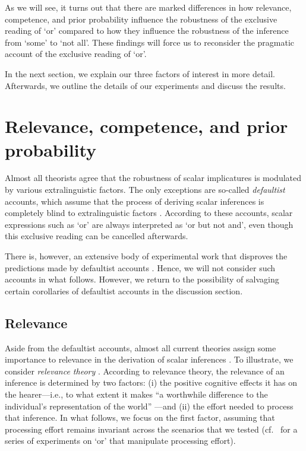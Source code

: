 \documentclass[12pt]{article}
\begin{document}
As we will see, it turns out that there are marked differences in how relevance, competence, and prior probability influence the robustness of the exclusive reading of `or' compared to how they influence the robustness of the inference from `some' to `not all'. These findings will force us to reconsider the pragmatic account of the exclusive reading of `or'.

In the next section, we explain our three factors of interest in more detail. Afterwards, we outline the details of our experiments and discuss the results.

\section{Relevance, competence, and prior probability}

Almost all theorists agree that the robustness of scalar implicatures is modulated by various extralinguistic factors. The only exceptions are so-called \emph{defaultist} accounts, which assume that the process of deriving scalar inferences is completely blind to extralinguistic factors \citep[e.g.,][]{chierchia2004, levinson2000, storto2005}. According to these accounts, scalar expressions such as `or' are always interpreted as `or but not and', even though this exclusive reading can be cancelled afterwards.

There is, however, an extensive body of experimental work that disproves the predictions made by defaultist accounts \citep[e.g.,][]{bott2004, breheny2006, huang2011}. Hence, we will not consider such accounts in what follows. However, we return to the possibility of salvaging certain corollaries of defaultist accounts in the discussion section.

\subsection*{Relevance}



Aside from the defaultist accounts, almost all current theories assign some importance to relevance in the derivation of scalar inferences \citep[e.g.,][]{geurts2010, magri2011}. To illustrate, we consider \emph{relevance theory} \citep{sperber1995}. According to relevance theory, the relevance of an inference is determined by two factors: (i) the positive cognitive effects it has on the hearer---i.e., to what extent it makes ``a worthwhile difference to the individual's representation of the world'' \citep[p.\ 251]{wilson2002}---and (ii) the effort needed to process that inference. In what follows, we focus on the first factor, assuming that processing effort remains invariant across the scenarios that we tested (cf.\ \citealt{chevallier2008} for a series of experiments on `or' that manipulate processing effort). 
\end{document}
